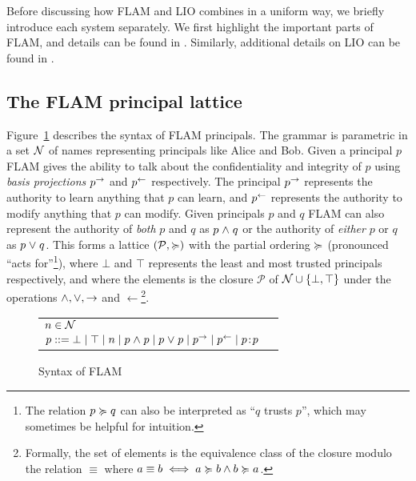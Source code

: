 Before discussing how FLAM and LIO combines in a uniform way, we briefly introduce each system separately. We first highlight the important parts of FLAM, and details can be found in \cite{Arden:2015:FA:2859845.2859998}. Similarly, additional details on LIO can be found in \cite{SRMMlio}.

\subsection{The FLAM principal lattice}
Figure~\ref{fig:flam-syntax} describes the syntax of FLAM principals. The grammar is parametric in a set $\mathcal{N}$ of names representing principals like Alice and Bob. Given a principal $p$ FLAM gives the ability to talk about the confidentiality and integrity of $p$ using \emph{basis projections} $p^{\rightarrow}$ and $p^{\leftarrow}$ respectively. The principal $p^{\rightarrow}$ represents the authority to learn anything that $p$ can learn, and $p^{\leftarrow}$ represents the authority to modify anything that $p$ can modify. Given principals $p$ and $q$ FLAM can also represent the authority of \emph{both} $p$ and $q$ as $p \mathrel{\land} q$ or the authority of \emph{either} $p$ or $q$ as $p \mathrel{\lor} q$. This forms a lattice $(\mathcal{P}, \succcurlyeq)$ with the partial ordering $\succcurlyeq$ (pronounced ``acts for''\footnote{The relation $p \succcurlyeq q$ can also be interpreted as ``$q$ trusts $p$'', which may sometimes be helpful for intuition.}), where $\bot$ and $\top$ represents the least and most trusted principals respectively, and where the elements is the closure $\mathcal{P}$ of $\mathcal{N} \cup \{\bot, \top\}$ under the operations $\mathrel{\land}, \mathrel{\lor}, \rightarrow$ and $\leftarrow$\footnote{Formally, the set of elements is the equivalence class of the closure modulo the relation $\equiv$ where $a \equiv b \iff a \succcurlyeq b \wedge b \succcurlyeq a$.}.

\begin{figure}
    \centering
    \begin{tabular}{ll}
    $n \in \mathcal{N}$ \\
    $p ::= \bot \mid \top \mid n \mid p \mathrel{\land} p \mid p \mathrel{\lor} p \mid p^{\rightarrow} \mid p^{\leftarrow} \mid p\!:\!p$
    \end{tabular}
    \caption{Syntax of FLAM}
    \label{fig:flam-syntax}
\end{figure}


